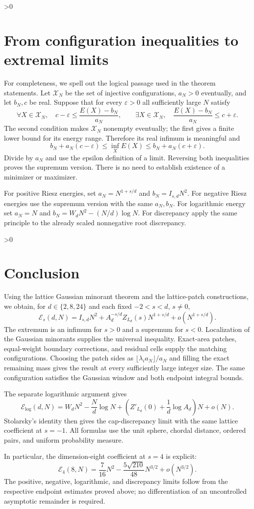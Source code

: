 \documentclass[11pt,a4paper]{article}
\theoremstyle{definition}
\newcommand{\cE}{\mathcal E}
\newcommand{\eps}{\varepsilon}
\numberwithin{equation}{section}
\let\originalsection\section
\renewcommand{\section}{\ifnum\value{section}>0\clearpage\fi\originalsection}
\begin{document}
\section{From configuration inequalities to extremal limits}\label{sec:extrema}
For completeness, we spell out the logical passage used in the theorem statements. Let $\mathcal X_N$ be the set of injective configurations, $a_N>0$ eventually, and let $b_N,c$ be real. Suppose that for every $\eps>0$ all sufficiently large $N$ satisfy
\begin{equation}\label{eq:boundslogic}
 \forall X\in\mathcal X_N,\quad c-\eps\le\frac{E(X)-b_N}{a_N},
 \qquad
 \exists X\in\mathcal X_N,\quad\frac{E(X)-b_N}{a_N}\le c+\eps.
\end{equation}
The second condition makes $\mathcal X_N$ nonempty eventually; the first gives a finite lower bound for its energy range. Therefore its real infimum is meaningful and
\[
 b_N+a_N(c-\eps)\le\inf_XE(X)\le b_N+a_N(c+\eps).
\]
Divide by $a_N$ and use the epsilon definition of a limit. Reversing both inequalities proves the supremum version. There is no need to establish existence of a minimizer or maximizer.

For positive Riesz energies, set $a_N=N^{1+s/d}$ and $b_N=I_{s,d}N^2$. For negative Riesz energies use the supremum version with the same $a_N,b_N$. For logarithmic energy set $a_N=N$ and $b_N=W_dN^2-(N/d)\log N$. For discrepancy apply the same principle to the already scaled nonnegative root discrepancy.

\section{Conclusion}
Using the lattice Gaussian minorant theorem and the lattice-patch constructions, we obtain, for $d\in\{2,8,24\}$ and each fixed $-2<s<d$, $s\ne0$,
\[
 \cE_s(d,N)=I_{s,d}N^2+A_d^{-s/d}Z_{L_d}(s)N^{1+s/d}
                  +o(N^{1+s/d}).
\]
The extremum is an infimum for $s>0$ and a supremum for $s<0$. Localization of the Gaussian minorants supplies the universal inequality. Exact-area patches, equal-weight boundary corrections, and residual cells supply the matching configurations. Choosing the patch sides as $\lfloor\lambda_i a_N\rfloor/a_N$ and filling the exact remaining mass gives the result at every sufficiently large integer size. The same configuration satisfies the Gaussian window and both endpoint integral bounds.

The separate logarithmic argument gives
\[
 \cE_{\log}(d,N)=W_dN^2-\frac Nd\log N+
 \left(Z'_{L_d}(0)+\frac1d\log A_d\right)N+o(N).
\]
Stolarsky's identity then gives the cap-discrepancy limit with the same lattice coefficient at $s=-1$. All formulas use the unit sphere, chordal distance, ordered pairs, and uniform probability measure.

In particular, the dimension-eight coefficient at $s=4$ is explicit:
\[
 \boxed{\cE_4(8,N)=\frac7{16}N^2-
 \frac{5\sqrt{210}}{48}N^{3/2}+o(N^{3/2}).}
\]
The positive, negative, logarithmic, and discrepancy limits follow from the respective endpoint estimates proved above; no differentiation of an uncontrolled asymptotic remainder is required.
\end{document}
